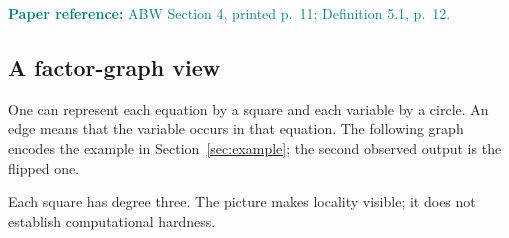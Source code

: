 \documentclass[11pt,a4paper]{article}
\newcommand{\readref}[1]{\textcolor{teal}{\small\textbf{Paper reference:} #1}}
\begin{document}
\readref{ABW Section 4, printed p.~11; Definition 5.1, p.~12.}

\subsection{A factor-graph view}
One can represent each equation by a square and each variable by a circle. An edge means that the variable occurs in that equation. The following graph encodes the example in Section~\ref{sec:example}; the second observed output is the flipped one.
\begin{center}
\end{center}
Each square has degree three. The picture makes locality visible; it does not establish computational hardness.
\end{document}
